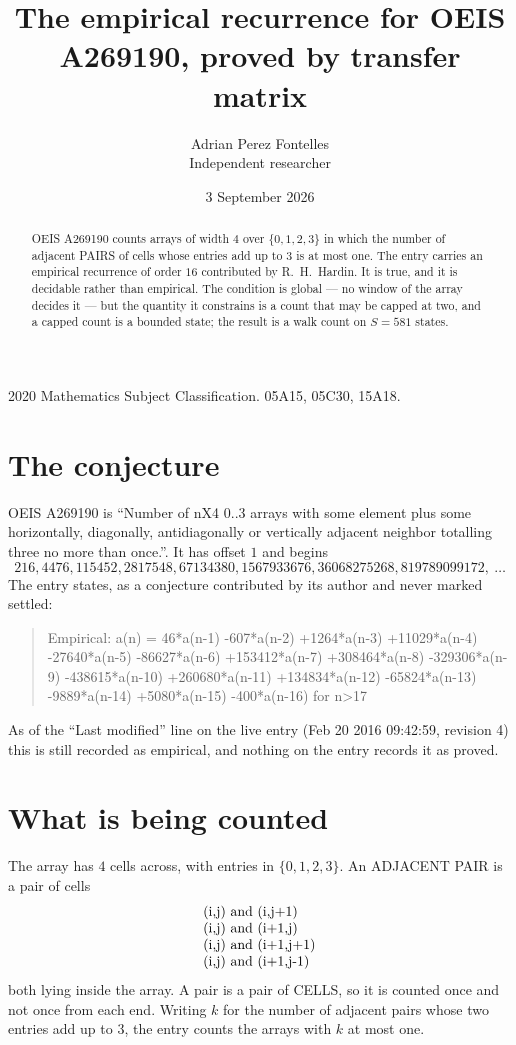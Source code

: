 \documentclass[11pt,a4paper]{article}
\title{The empirical recurrence for OEIS A269190, proved by transfer matrix}
\author{Adrian Perez Fontelles\\ \small Independent researcher}
\date{3 September 2026}
\theoremstyle{plain}
\theoremstyle{definition}
\begin{document}
\maketitle

\begin{abstract}
OEIS A269190 counts arrays of width $4$ over $\{0,1,2,3\}$ in which the number of adjacent PAIRS of
cells whose entries add up to $3$ is at most one. The entry carries an empirical recurrence of
order $16$ contributed by R.~H.~Hardin. It is true, and it is decidable rather than
empirical. The condition is global --- no window of the array decides it --- but the quantity
it constrains is a count that may be capped at two, and a capped count is a bounded state; the
result is a walk count on $S=581$ states.
\end{abstract}

\noindent\small 2020 Mathematics Subject Classification. 05A15, 05C30, 15A18.\normalsize

\section{The conjecture}

OEIS A269190 is ``Number of nX4 0..3 arrays with some element plus some horizontally, diagonally, antidiagonally or vertically adjacent neighbor totalling three no more than once.''. It has offset $1$ and begins
\[
216, 4476, 115452, 2817548, 67134380, 1567933676, 36068275268, 819789099172,\ \dots
\]
The entry states, as a conjecture contributed by its author and never marked settled:
\begin{quote}
Empirical: a(n) = 46*a(n-1) -607*a(n-2) +1264*a(n-3) +11029*a(n-4) -27640*a(n-5) -86627*a(n-6) +153412*a(n-7) +308464*a(n-8) -329306*a(n-9) -438615*a(n-10) +260680*a(n-11) +134834*a(n-12) -65824*a(n-13) -9889*a(n-14) +5080*a(n-15) -400*a(n-16) for n>17
\end{quote}
As of the ``Last modified'' line on the live entry (Feb 20 2016 09:42:59, revision 4) this is still
recorded as empirical, and nothing on the entry records it as proved.

\section{What is being counted}

The array has $4$ cells across, with entries in $\{0,1,2,3\}$. An ADJACENT PAIR is a pair of cells
\[
\begin{array}{l}
$(i,j)\text{ and }(i,j{+}1)$ \\
$(i,j)\text{ and }(i{+}1,j)$ \\
$(i,j)\text{ and }(i{+}1,j{+}1)$ \\
$(i,j)\text{ and }(i{+}1,j{-}1)$ \\
\end{array}
\]
both lying inside the array. A pair is a pair of CELLS, so it is counted once and not once from
each end. Writing $k$ for the number of adjacent pairs whose two entries add up to $3$, the
entry counts the arrays with $k$ at most one.
\end{document}
